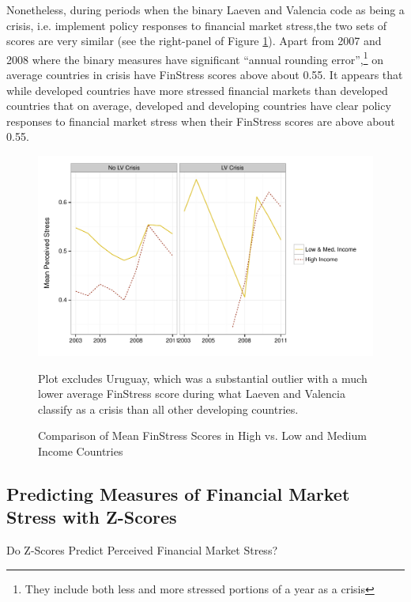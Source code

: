 \documentclass[]{article}
\begin{document}
Nonetheless, during periods when the binary Laeven and Valencia code as being a crisis, i.e. implement policy responses to financial market stress,the two sets of scores are very similar (see the right-panel of Figure \ref{comp_dev_developing}). Apart from 2007 and 2008 where the binary measures have significant ``annual rounding error'',\footnote{They include both less and more stressed portions of a year as a crisis} on average countries in crisis have FinStress scores above about 0.55. It appears that while developed countries have more stressed financial markets than developed countries that on average, developed and developing countries have clear policy responses to financial market stress when their FinStress scores are above about 0.55.

\begin{figure}
    \caption{Comparison of Mean FinStress Scores in High vs. Low and Medium Income Countries}
    \label{comp_dev_developing}

    \begin{center}
        \includegraphics[scale=0.55]{figures/dev_vs_developing.pdf}
    \end{center}
    {\scriptsize{Plot excludes Uruguay, which was a substantial outlier with a much lower average FinStress score during what Laeven and Valencia classify as a crisis than all other developing countries.}}
\end{figure}

\subsection*{Predicting Measures of Financial Market Stress with Z-Scores}

\begin{table}[H]
    \caption{Do Z-Scores Predict Perceived Financial Market Stress?}
    \label{epfms_z_regress}

    \begin{center}
    {\tiny{
        
    }}
    \end{center}
\end{table}
\end{document}
